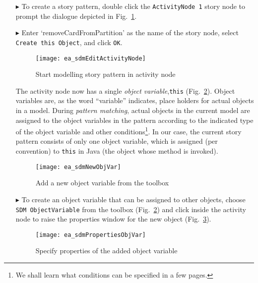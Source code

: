\begin{itemize}
\item[$\blacktriangleright$] To create a story pattern, double click the \texttt{ActivityNode 1} story node to prompt the dialogue depicted in
Fig.~\ref{fig:story_pattern}.

\item[$\blacktriangleright$] Enter `removeCardFromPartition' as the name of the story node, select \texttt{Create this Object}, and click \texttt{OK}.

\begin{figure}[htpb]
\begin{center} 
  \texttt{[image: ea\_sdmEditActivityNode]}
  \caption{Start modelling story pattern in activity node}  
  \label{fig:story_pattern}
\end{center}
\end{figure}

The activity node now has a single \emph{object variable},\texttt{this} (Fig.~\ref{fig:tool_box}). Object variables are, as
the word ``variable'' indicates, place holders for actual objects in a model.  During \emph{pattern matching}, actual objects in the 
current model are assigned to the object variables in the pattern according to  the indicated type of the object variable and other conditions\footnote{We shall
learn what conditions can be specified in a few pages.}.  In our case, the current story pattern consists of only one object variable, which is assigned (per
convention) to \texttt{this} in Java (the object whose method is invoked).

\begin{figure}[htp]
\begin{center}
  \texttt{[image: ea\_sdmNewObjVar]}
  \caption{Add a new object variable from the toolbox}  
  \label{fig:tool_box}
\end{center}
\end{figure}

\newpage

\item[$\blacktriangleright$] To create an object variable that can be assigned to other objects, choose \texttt{SDM ObjectVariable} from the toolbox
(Fig.~\ref{fig:tool_box}) and click inside the activity node to raise the properties window for the new object (Fig.~\ref{fig:object_variable_properties}).

\begin{figure}[htp]
\begin{center}
  \texttt{[image: ea\_sdmPropertiesObjVar]}
  \caption{Specify properties of the added object variable}  
  \label{fig:object_variable_properties}
\end{center}
\end{figure}


\end{itemize}
